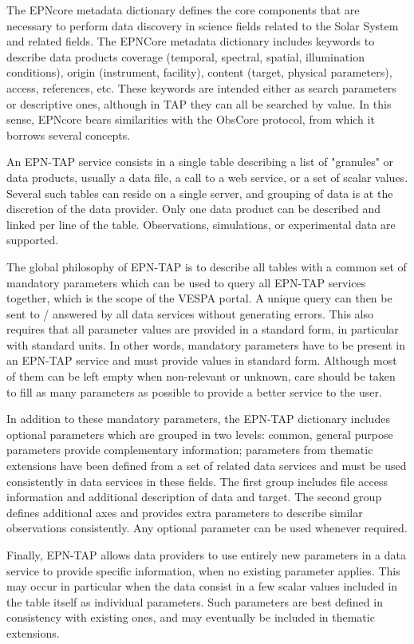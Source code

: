 \documentclass[11pt,a4paper]{ivoa}
\begin{document}
The EPNcore metadata dictionary defines the core components that are necessary to perform data discovery in science fields related to the Solar System and related fields. The EPNCore metadata dictionary includes keywords to describe data products coverage (temporal, spectral, spatial, illumination conditions), origin (instrument, facility), content (target, physical parameters), access, references, etc. These keywords are intended either as search parameters or descriptive ones, although in TAP they can all be searched by value. In this sense, EPNcore bears similarities with the ObsCore protocol, from which it borrows several concepts. 

An EPN-TAP service consists in a single table describing a list of "granules" or data products, usually a data file, a call to a web service, or a set of scalar values. Several such tables can reside on a single server, and grouping of data is at the discretion of the data provider. Only one data product can be described and linked per line of the table. Observations, simulations, or experimental data are supported. 

The global philosophy of EPN-TAP is to describe all tables with a common set of mandatory parameters which can be used to query all EPN-TAP services together, which is the scope of the VESPA portal. A unique query can then be sent to / answered by all data services without generating errors. This also requires that all parameter values are provided in a standard form, in particular with standard units. In other words, mandatory parameters have to be present in an EPN-TAP service and must provide values in standard form. Although most of them can be left empty when non-relevant or unknown, care should be taken to fill as many parameters as possible to provide a better service to the user.  

In addition to these mandatory parameters, the EPN-TAP dictionary includes optional parameters which are grouped in two levels: common, general purpose parameters provide complementary information; parameters from thematic extensions have been defined from a set of related data services and must be used consistently in data services in these fields. The first group includes file access information and additional description of data and target. The second group defines additional axes and provides extra parameters to describe similar observations consistently. Any optional parameter can be used whenever required. 

Finally, EPN-TAP allows data providers to use entirely new parameters in a data service to provide specific information, when no existing parameter applies. This may occur in particular when the data consist in a few scalar values included in the table itself as individual parameters. Such parameters are best defined in consistency with existing ones, and may eventually be included in thematic extensions. 
\end{document}

